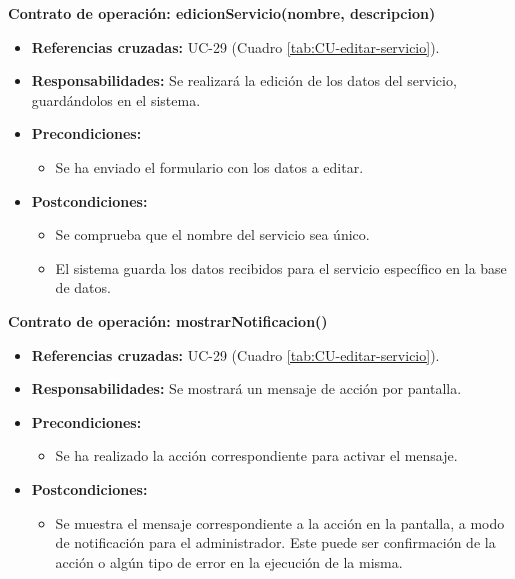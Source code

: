 \textbf{Contrato de operación: edicionServicio(nombre, descripcion)}
\begin{itemize}
\item \textbf{Referencias cruzadas:} UC-29 (Cuadro \ref{tab:CU-editar-servicio}).
\item \textbf{Responsabilidades:} Se realizará la edición de los datos del servicio, guardándolos en el sistema.
\item \textbf{Precondiciones:} 
 \begin{itemize}
\item Se ha enviado el formulario con los datos a editar.
\end {itemize}
\item \textbf{Postcondiciones:} 
 \begin{itemize}
 \item Se comprueba que el nombre del servicio sea único.
\item El sistema guarda los datos recibidos para el servicio específico en la base de datos.
\end {itemize}
\end {itemize}

\textbf{Contrato de operación: mostrarNotificacion()}
\begin{itemize}
\item \textbf{Referencias cruzadas:} UC-29 (Cuadro \ref{tab:CU-editar-servicio}).
\item \textbf{Responsabilidades:} Se mostrará un mensaje de acción por pantalla.
\item \textbf{Precondiciones:} 
 \begin{itemize}
\item Se ha realizado la acción correspondiente para activar el mensaje.
\end {itemize}
\item \textbf{Postcondiciones:} 
 \begin{itemize}
\item Se muestra el mensaje correspondiente a la acción en la pantalla, a modo de notificación para el administrador. Este puede ser confirmación de la acción o algún tipo de error en la ejecución de la misma.
\end {itemize}
\end {itemize}


\vspace{10mm}

